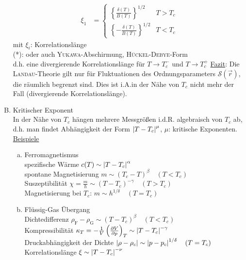 \begin{enumerate}[A)]
\begin{equation}
\begin{split}
            \xi_1 &= 
            \begin{cases}
                \left\{ \frac{\delta(T)}{B(T)} \right\}^{1/2} & T > T_c \\
                \left\{ - \frac{\delta(T)}{B(T)} \right\}^{1/2} & T < T_c
            \end{cases}
        \end{split}
    \end{equation}
    mit $\xi_i$: Korrelationslänge \\
    (*): oder auch \textsc{Yukawa}-Abschirmung, \textsc{Hückel-Debye}-Form \\
    d.h. eine divergierende Korrelationslänge für $T\to T_c^-$ und $T \to T_c^+$
    \underline{Fazit}: Die \textsc{Landau}-Theorie gilt nur für Fluktuationen des Ordnungsparameters $\mathcal{S}(\vec{r})$, die räumlich begrenzt sind.
    Dies ist i.A.in der Nähe von $T_c$ nicht mehr der Fall (divergierende Korrelationslänge).
    \item Kritischer Exponent \\
    In der Nähe von $T_c$ hängen mehrere Messgrößen i.d.R. algebraisch von $T_c$ ab, d.h. man findet Abhängigkeit der Form $\left| T-T_c \right|^\mu$,
    $\mu$: kritische Exponenten.\\
    \underline{Beispiele}
    \begin{enumerate}[a)]
        \item Ferromagnetismus \\
        spezifische Wärme $c(T) \sim \left| T-T_c \right|^\alpha$ \\
        spontane Magnetisierung $m \sim (T_c-T)^\beta \quad (T<T_c)$ \\
        Suszeptibilität $\chi = \frac{m}{h} \sim (T-T_c)^{-\gamma} \quad (T > T_c)$ \\
        Magnetisierung bei $T_c$: $m \sim h^{1/\delta} \quad (T=T_c)$
        \item Flüssig-Gas Übergang \\
        Dichtedifferenz $\rho_\text{F}-\rho_\text{G} \sim (T-T_c)^\beta \quad (T < T_c)$ \\
        Kompressibilität $\kappa_T = - \frac{1}{V} \left( \frac{\partial V}{\partial p} \right)_{T} \sim \left| T-T_c \right|^{-\gamma}$ \\
        Druckabhängigkeit der Dichte $\left| \rho-\rho_c \right| \sim \left| p-p_c \right|^{1/\delta} \quad (T=T_c)$ \\
        Korrelationslänge $\xi \sim \left| T-T_c \right|^{-\nu}$
    \end{enumerate}
    \begin{table}

\end{table}
\end{enumerate}
